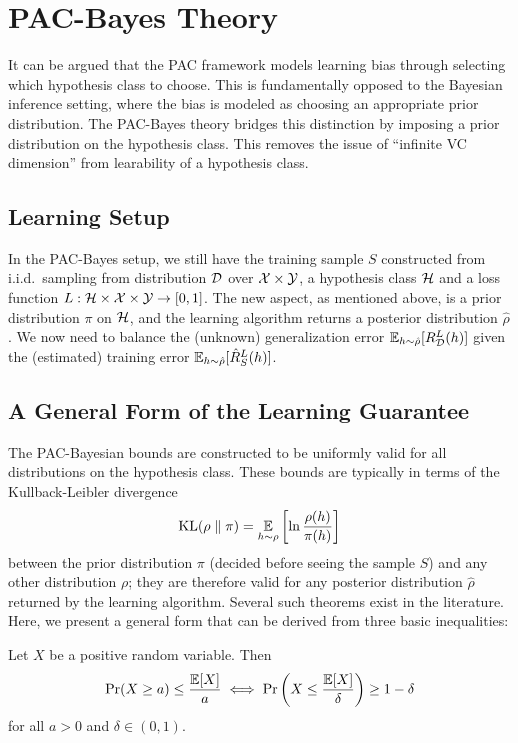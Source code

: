 \section{PAC-Bayes Theory}

It can be argued that the PAC framework models learning bias through selecting
which hypothesis class to choose. This is fundamentally opposed to the Bayesian
inference setting, where the bias is modeled as choosing an appropriate prior
distribution. The PAC-Bayes theory bridges this distinction by imposing a prior
distribution on the hypothesis class. This removes the issue of ``infinite VC
dimension'' from learability of a hypothesis class.

\subsection{Learning Setup}

In the PAC-Bayes setup, we still have the training sample $S$ constructed from
i.i.d.\ sampling from distribution $\mathcal{D}$ over $\mathcal{X} \times \mathcal{Y}$, a hypothesis
class $\mathcal{H}$ and a loss function $L : \mathcal{H} \times \mathcal{X} \times \mathcal{Y} \to [0, 1]$. The
new aspect, as mentioned above, is a prior distribution $\pi$ on $\mathcal{H}$, and the
learning algorithm returns a posterior distribution $\hat{\rho}$. We now need to
balance the (unknown) generalization error $\operatorname*{\mathbb{E}}_{h \sim \hat{\rho}}[R_{\mathcal{D}}^L(h)]$
given the (estimated) training error $\operatorname*{\mathbb{E}}_{h \sim \hat{\rho}}[\hat{R}_S^L(h)]$.

\subsection{A General Form of the Learning Guarantee}

The PAC-Bayesian bounds are constructed to be uniformly valid for all
distributions on the hypothesis class. These bounds are typically in terms of
the Kullback-Leibler divergence
\begin{equation}
  \text{KL}(\rho \parallel \pi) = \operatorname*{\mathbb{E}}_{h \sim \rho}\left[\ln\frac{\rho(h)}{\pi(h)}\right]
\end{equation}
between the prior distribution $\pi$ (decided before seeing the sample $S$) and
any other distribution $\rho$; they are therefore valid for any posterior
distribution $\hat{\rho}$ returned by the learning algorithm. Several such
theorems exist in the literature. Here, we present a general form that can be
derived from three basic inequalities:

\begin{lemma}
  Let $X$ be a positive random variable. Then
  \begin{equation}
    \Pr(X \geq a) \leq \frac{\operatorname*{\mathbb{E}}[X]}{a} \iff \Pr\left(X \leq
    \frac{\operatorname*{\mathbb{E}}[X]}{\delta}\right) \geq 1 - \delta
  \end{equation}
  for all $a > 0$ and $\delta \in (0, 1)$.
\end{lemma}

